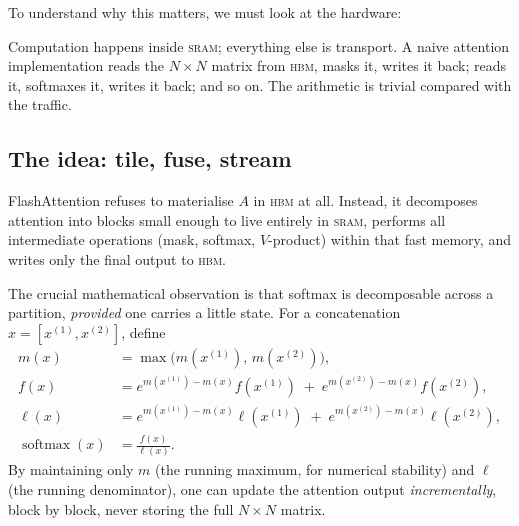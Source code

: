 \documentclass[11pt,a4paper]{article}
\theoremstyle{definition}
\theoremstyle{plain}
\newcommand{\softmax}{\operatorname{softmax}}
\newcommand{\HBM}{\textsc{hbm}}
\newcommand{\SRAM}{\textsc{sram}}
\newcommand{\GPU}{\textsc{gpu}}
\begin{document}
To understand why this matters, we must look at the hardware:

\begin{center}
\end{center}

Computation happens inside \SRAM{}; everything else is transport. A naive attention implementation reads the $N\times N$ matrix from \HBM{}, masks it, writes it back; reads it, softmaxes it, writes it back; and so on. The arithmetic is trivial compared with the traffic.

\subsection{The idea: tile, fuse, stream}

FlashAttention refuses to materialise $A$ in \HBM{} at all. Instead, it decomposes attention into blocks small enough to live entirely in \SRAM{}, performs all intermediate operations (mask, softmax, $V$-product) within that fast memory, and writes only the final output to \HBM{}.

The crucial mathematical observation is that softmax is decomposable across a partition, \emph{provided} one carries a little state. For a concatenation $x = [x^{(1)}, x^{(2)}]$, define
\begin{align}
m(x) &= \max\bigl(m(x^{(1)}),\, m(x^{(2)})\bigr), \\[2pt]
f(x) &= e^{m(x^{(1)}) - m(x)} f(x^{(1)}) \;+\; e^{m(x^{(2)}) - m(x)} f(x^{(2)}), \\[2pt]
\ell(x) &= e^{m(x^{(1)}) - m(x)} \ell(x^{(1)}) \;+\; e^{m(x^{(2)}) - m(x)} \ell(x^{(2)}), \\[2pt]
\softmax(x) &= \frac{f(x)}{\ell(x)}.
\end{align}
By maintaining only $m$ (the running maximum, for numerical stability) and $\ell$ (the running denominator), one can update the attention output \emph{incrementally}, block by block, never storing the full $N\times N$ matrix.
\end{document}

